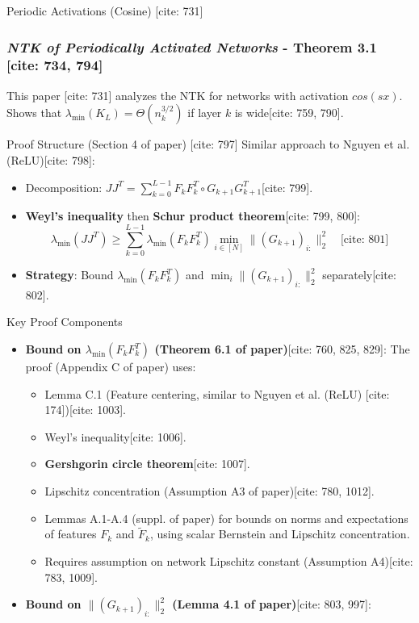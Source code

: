 \documentclass{beamer}
\theoremstyle{definition}
\theoremstyle{remark}
\newcommand{\lambdaMin}{\lambda_{\min}}
\begin{document}
\begin{frame}{Periodic Activations (Cosine) [cite: 731]}
  \frametitle{\textit{NTK of Periodically Activated Networks} - Theorem 3.1 [cite: 734, 794]}
  \justify
  This paper [cite: 731] analyzes the NTK for networks with activation $cos(sx)$. Shows that $\lambdaMin(K_L) = \Theta(n_k^{3/2})$ if layer $k$ is wide[cite: 759, 790].

  \begin{block}{Proof Structure (Section 4 of paper) [cite: 797]}
    Similar approach to Nguyen et al. (ReLU)[cite: 798]:
    \begin{itemize}
      \item Decomposition: $JJ^T = \sum_{k=0}^{L-1} F_k F_k^T \circ G_{k+1} G_{k+1}^T$[cite: 799].
      \item \textbf{Weyl's inequality} then \textbf{Schur product theorem}[cite: 799, 800]:
      $$ \lambdaMin(JJ^T) \ge \sum_{k=0}^{L-1} \lambdaMin(F_k F_k^T) \min_{i \in [N]} \|(G_{k+1})_{i:}\|_2^2 \quad \text{[cite: 801]} $$
      \item \textbf{Strategy}: Bound $\lambdaMin(F_k F_k^T)$ and $\min_i \|(G_{k+1})_{i:}\|_2^2$ separately[cite: 802].
    \end{itemize}
  \end{block}
  \pause
  \begin{block}{Key Proof Components}
    \begin{itemize}
      \item \textbf{Bound on $\lambdaMin(F_k F_k^T)$ (Theorem 6.1 of paper)}[cite: 760, 825, 829]:
        The proof (Appendix C of paper) uses:
        \begin{itemize}
          \item Lemma C.1 (Feature centering, similar to Nguyen et al. (ReLU) [cite: 174])[cite: 1003].
          \item Weyl's inequality[cite: 1006].
          \item \textbf{Gershgorin circle theorem}[cite: 1007].
          \item Lipschitz concentration (Assumption A3 of paper)[cite: 780, 1012].
          \item Lemmas A.1-A.4 (suppl. of paper) for bounds on norms and expectations of features $F_k$ and $\tilde{F}_k$, using scalar Bernstein and Lipschitz concentration.
          \item Requires assumption on network Lipschitz constant (Assumption A4)[cite: 783, 1009].
        \end{itemize}
      \item \textbf{Bound on $\|(G_{k+1})_{i:}\|_2^2$ (Lemma 4.1 of paper)}[cite: 803, 997]:

\end{itemize}
\end{block}
\end{frame}
\end{document}
